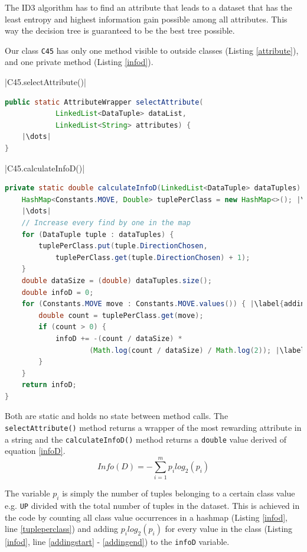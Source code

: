 \documentclass{article}
\begin{document}
    The ID3 algorithm has to find an attribute that leads to a dataset that has the least entropy and highest information gain possible among all attributes. This way the decision tree is guaranteed to be the best tree possible.

    Our class \verb|C45| has only one method visible to outside classes (Listing \ref{attribute}), and one private method (Listing \ref{infod}).

    |C45.selectAttribute()|
    \begin{lstlisting}[language=Java, caption=Method declaration of \protect\UseVerb{term}, label={attribute}, escapechar=|]
public static AttributeWrapper selectAttribute(
            LinkedList<DataTuple> dataList,
            LinkedList<String> attributes) {
    |\dots|
}
    \end{lstlisting}

    |C45.calculateInfoD()|
    \begin{lstlisting}[language=Java, caption=Method definition of \protect\UseVerb{term2}, label={infod}, escapechar=|]
private static double calculateInfoD(LinkedList<DataTuple> dataTuples) {
    HashMap<Constants.MOVE, Double> tuplePerClass = new HashMap<>(); |\label{tupleperclass}|
    |\dots|
    // Increase every find by one in the map
    for (DataTuple tuple : dataTuples) {
        tuplePerClass.put(tuple.DirectionChosen,
            tuplePerClass.get(tuple.DirectionChosen) + 1);
    }
    double dataSize = (double) dataTuples.size();
    double infoD = 0;
    for (Constants.MOVE move : Constants.MOVE.values()) { |\label{addingstart}|
        double count = tuplePerClass.get(move);
        if (count > 0) {
            infoD += -(count / dataSize) *
                    (Math.log(count / dataSize) / Math.log(2)); |\label{addingend}|
        }
    }
    return infoD;
}\end{lstlisting}

    Both are static and holds no state between method calls. The \verb|selectAttribute()| method returns a wrapper of the most rewarding attribute in a string and the \verb|calculateInfoD()| method returns a \verb|double| value derived of equation \ref{infoD}.
    \begin{equation} \label{infoD}
    Info(D)=-\sum_{i=1}^{m}p_i log_2(p_i)
    \end{equation}

    The variable $p_i$ is simply the number of tuples belonging to a certain class value e.g. \verb|UP| divided with the total number of tuples in the dataset. This is achieved in the code by counting all class value occurrences in a hashmap (Listing \ref{infod}, line \ref{tupleperclass}) and adding $p_i log_2(p_i)$ for every value in the class (Listing \ref{infod}, line \ref{addingstart} - \ref{addingend}) to the \verb|infoD| variable.
\end{document}
